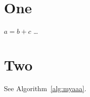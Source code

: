 \documentclass[a4paper]{book}
\begin{document}
\makeatletter
\show\float@makebox
\show\caption@ORI@float@makebox
\makeatother

\tableofcontents

\chapter{One}

\begin{algorithm}
\caption{Iris Detection Algorithm}\label{alg:myaaa}
\begin{algorithmic}[1]
   \State $a=b+c$
   \State \ldots
   \EndIf
\end{algorithmic}
\end{algorithm}

\chapter{Two}

See Algorithm~\ref{alg:myaaa}.
\end{document}
